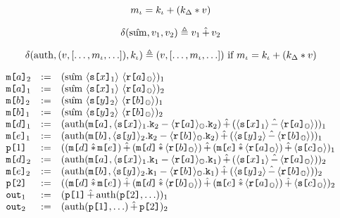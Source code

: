 $$
m_\iota = k_\iota + (k_\Delta * v)
$$

$$
\delta(\hat{\mathrm{sum}},v_1,v_2) \triangleq v_1 \,\hat{+}\, v_2
$$

$$
\delta(\mathrm{auth}, (v, [\ldots,m_\iota,\ldots]), k_\iota) \triangleq
     (v, [\ldots,m_\iota,\ldots]) \text{\ if\ } m_\iota = k_\iota + (k_\Delta * v)
$$

$$
\begin{array}{lcl}
  \elab{\mesg{a}}{2} &:=&
  \elab{(\macotp\ \macgv{\elab{\secret{x}}{1}}\ \macgv{\elab{\flip{a}}{\Oracle}})}{1}\\
  \elab{\mesg{a}}{1} &:=&
  \elab{(\macotp\ \macgv{\elab{\secret{x}}{1}}\ \macgv{\elab{\flip{a}}{\Oracle}})}{2}\\
  \elab{\mesg{b}}{2} &:=&
  \elab{(\macotp\ \macgv{\elab{\secret{y}}{2}}\ \macgv{\elab{\flip{b}}{\Oracle}})}{1}\\
  \elab{\mesg{b}}{1} &:=&
  \elab{(\macotp\ \macgv{\elab{\secret{y}}{2}}\ \macgv{\elab{\flip{b}}{\Oracle}})}{2}\\
  \elab{\mesg{d}}{1} &:=&
  \elab{(\macauth(\mesg{a}, \mack{\macx{\secret{x}}{1}}{2} \fminus \mack{\macx{\flip{a}}{\Oracle}}{2}) \macplus (\macgv{\elab{\secret{x}}{1}}\macminus\macgv{\elab{\flip{a}}{\Oracle}}))}{1}\\
  \elab{\mesg{e}}{1}&:=&
  \elab{(\macauth(\mesg{b}, \mack{\macx{\secret{y}}{2}}{2} \fminus \mack{\macx{\flip{b}}{\Oracle}}{2}) \macplus (\macgv{\elab{\secret{y}}{2}}\macminus\macgv{\elab{\flip{b}}{\Oracle}}))}{1}\\
  \rvl{1} &:=&
  \elab{( (\mesg{d} \mactimes \mesg{e}) \macplus
          (\mesg{d} \mactimes \macgv{\elab{\flip{b}}{\Oracle}}) \macplus
          (\mesg{e} \mactimes \macgv{\elab{\flip{a}}{\Oracle}}) \macplus \macgv{\elab{\secret{c}}{\Oracle}}
    )}{1}\\
  \elab{\mesg{d}}{2} &:=&
  \elab{(\macauth(\mesg{a}, \mack{\macx{\secret{x}}{1}}{1} \fminus \mack{\macx{\flip{a}}{\Oracle}}{1}) \macplus (\macgv{\elab{\secret{x}}{1}}\macminus\macgv{\elab{\flip{a}}{\Oracle}}))}{2}\\
  \elab{\mesg{e}}{2}&:=&
  \elab{(\macauth(\mesg{b}, \mack{\macx{\secret{y}}{2}}{1} \fminus \mack{\macx{\flip{b}}{\Oracle}}{1}) \macplus (\macgv{\elab{\secret{y}}{2}}\macminus\macgv{\elab{\flip{b}}{\Oracle}}))}{2}\\
  \rvl{2} &:=&
  \elab{( (\mesg{d} \mactimes \mesg{e}) \macplus
          (\mesg{d} \mactimes \macgv{\elab{\flip{b}}{\Oracle}}) \macplus
          (\mesg{e} \mactimes \macgv{\elab{\flip{a}}{\Oracle}}) \macplus \macgv{\elab{\secret{c}}{\Oracle}}
    )}{2}\\
  \out{1} &:=& \elab{(\rvl{1} \macplus \macauth(\rvl{2},\ldots))}{1} \\
  \out{2} &:=& \elab{(\macauth(\rvl{1},\ldots) \macplus \rvl{2})}{2}
\end{array}
$$


